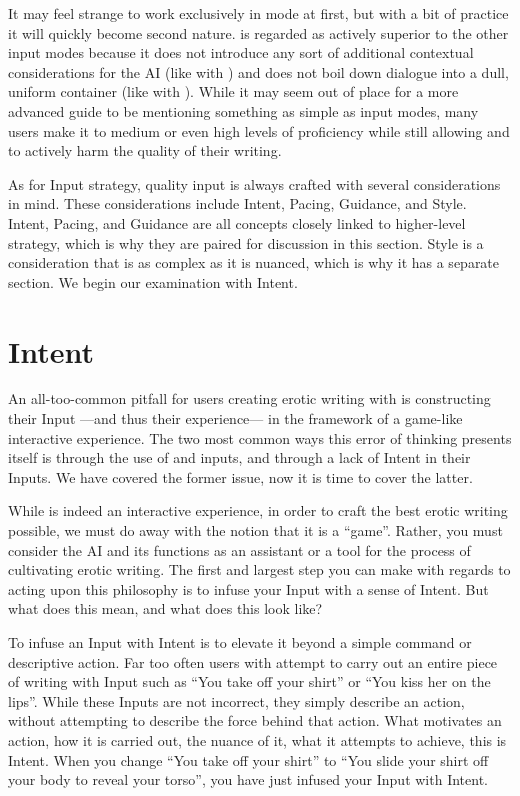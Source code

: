 \documentclass[Coomer-main.tex]{subfiles}
\begin{document}
It may feel strange to work exclusively in \story mode at first, but with a bit of practice it will quickly become second nature.
\story is regarded as actively superior to the other input modes because it does not introduce any sort of additional contextual considerations for the AI (like with \Do) and does not boil down dialogue into a dull, uniform container (like with \say).
While it may seem out of place for a more advanced guide to be mentioning something as simple as input modes, many users make it to medium or even high levels of proficiency while still allowing \Do and \say to actively harm the quality of their writing.

As for Input strategy, quality input is always crafted with several considerations in mind.
These considerations include Intent, Pacing, Guidance, and Style.
Intent, Pacing, and Guidance are all concepts closely linked to higher-level strategy, which is why they are paired for discussion in this section.
Style is a consideration that is as complex as it is nuanced, which is why it has a separate section.
We begin our examination with Intent.

\section{Intent}

An all-too-common pitfall for users creating erotic writing with \aid is constructing their Input —and thus their experience— in the framework of a game-like interactive experience.
The two most common ways this error of thinking presents itself is through the use of \Do and \say inputs, and through a lack of Intent in their Inputs.
We have covered the former issue, now it is time to cover the latter.

While \aid is indeed an interactive experience, in order to craft the best erotic writing possible, we must do away with the notion that it is a “game”.
Rather, you must consider the AI and its functions as an assistant or a tool for the process of cultivating erotic writing.
The first and largest step you can make with regards to acting upon this philosophy is to infuse your Input with a sense of Intent.
But what does this mean, and what does this look like?

To infuse an Input with Intent is to elevate it beyond a simple command or descriptive action.
Far too often users with attempt to carry out an entire piece of writing with Input such as “You take off your shirt” or “You kiss her on the lips”.
While these Inputs are not incorrect, they simply describe an action, without attempting to describe the force behind that action.
What motivates an action, how it is carried out, the nuance of it, what it attempts to achieve, this is Intent.
When you change “You take off your shirt” to “You slide your shirt off your body to reveal your torso”, you have just infused your Input with Intent.
\end{document}
